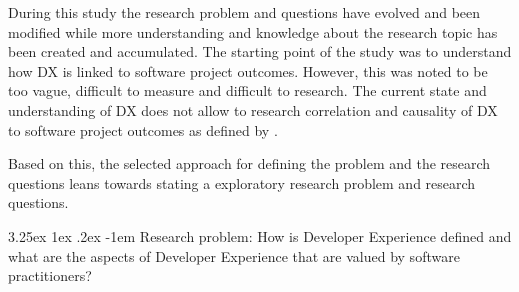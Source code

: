 \documentclass[english, 12pt, a4paper, sci, utf8, a-1b, online]{aaltothesis}
\makeatletter
\renewcommand\paragraph{\@startsection{paragraph}{5}{\z@}%
  {3.25ex \@plus1ex \@minus.2ex}%
  {-1em}%
  {\normalfont\normalsize\bfseries}}
\makeatother
\begin{document}
During this study the research problem and questions have evolved and been modified while more understanding and knowledge about the research topic has been created and accumulated. The starting point of the study was to understand how DX is linked to software project outcomes. However, this was noted to be too vague, difficult to measure and difficult to research. The current state and understanding of DX does not allow to research correlation and causality of DX to software project outcomes as defined by \cite{easterbrook2008selecting}.

Based on this, the selected approach for defining the problem and the research questions leans towards stating a exploratory research problem and research questions.

\newcommand{\researchproblem}{How is Developer Experience defined and what are the aspects of Developer Experience that are valued by software practitioners?}

\paragraph{Research problem:} \researchproblem

\newcommand{\rqone}{What is the definition and aspects of Developer Experience, and how do they differ between scientific literature and literature written by practitioners?}
\newcommand{\rqonepointone}{What objects/entities have been studied with respect to developer experience?}
\newcommand{\rqonepointtwo}{What methods have been used to study developer experience?}
\newcommand{\rqonepointthree}{What are the main results of the existing research on developer experience?}
\newcommand{\rqonepointfour}{What is known about factors that improve or worsen developer experience?}
\newcommand{\rqtwo}{How is Developer Experience and its aspects defined by different roles in a software consultancy company?}
\newcommand{\rqthree}{What aspects of Developer Experience do software developers in a software consultancy company value and see important?}

\end{document}

